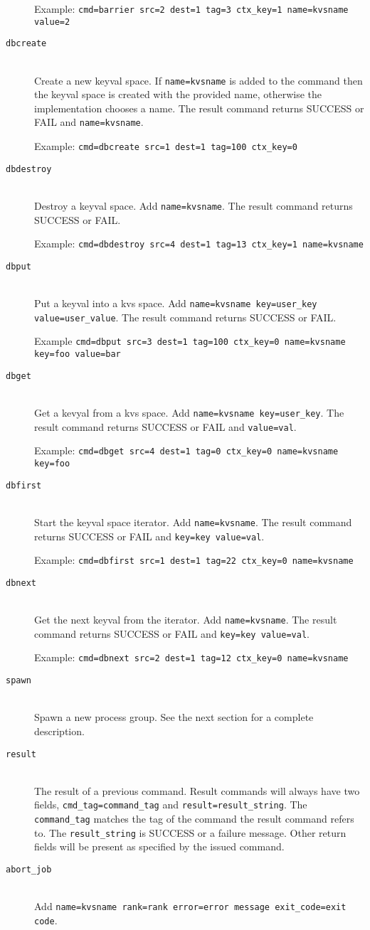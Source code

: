 \documentclass[dvipdfm,11pt]{article}
\begin{document}
\begin{description}
Example: \texttt{cmd=barrier src=2 dest=1 tag=3 ctx\_key=1 name=kvsname value=2}
\item[\texttt{dbcreate}]\mbox{}\\
Create a new keyval space.  If \texttt{name=kvsname} is added to the command
then the keyval space is created with the provided name, otherwise the 
implementation chooses a name.
The result command returns SUCCESS or FAIL and \texttt{name=kvsname}.

Example: \texttt{cmd=dbcreate src=1 dest=1 tag=100 ctx\_key=0}
\item[\texttt{dbdestroy}]\mbox{}\\
Destroy a keyval space.  Add \texttt{name=kvsname}.
The result command returns SUCCESS or FAIL.

Example: \texttt{cmd=dbdestroy src=4 dest=1 tag=13 ctx\_key=1 name=kvsname}
\item[\texttt{dbput}]\mbox{}\\
Put a keyval into a kvs space.  Add \texttt{name=kvsname key=user\_key 
value=user\_value}.
The result command returns SUCCESS or FAIL.

Example \texttt{cmd=dbput src=3 dest=1 tag=100 ctx\_key=0 name=kvsname key=foo value=bar}
\item[\texttt{dbget}]\mbox{}\\
Get a kevyal from a kvs space.  Add \texttt{name=kvsname key=user\_key}.
The result command returns SUCCESS or FAIL and \texttt{value=val}.

Example: \texttt{cmd=dbget src=4 dest=1 tag=0 ctx\_key=0 name=kvsname key=foo}
\item[\texttt{dbfirst}]\mbox{}\\
Start the keyval space iterator.  Add \texttt{name=kvsname}.
The result command returns SUCCESS or FAIL and \texttt{key=key value=val}.

Example: \texttt{cmd=dbfirst src=1 dest=1 tag=22 ctx\_key=0 name=kvsname}
\item[\texttt{dbnext}]\mbox{}\\
Get the next keyval from the iterator.  Add \texttt{name=kvsname}.
The result command returns SUCCESS or FAIL and \texttt{key=key value=val}.

Example: \texttt{cmd=dbnext src=2 dest=1 tag=12 ctx\_key=0 name=kvsname}
\item[\texttt{spawn}]\mbox{}\\
Spawn a new process group.  See the next section for a complete description.
\item[\texttt{result}]\mbox{}\\
The result of a previous command.  Result commands will always have two 
fields, \texttt{cmd\_tag=command\_tag} and \texttt{result=result\_string}.
The \texttt{command\_tag} matches the tag of the command the result command 
refers to.  The \texttt{result\_string} is SUCCESS or a failure message. 
Other return fields will be present as specified by the issued command.
\item[\texttt{abort\_job}]\mbox{}\\
Add \texttt{name=kvsname
rank=rank
error=error message
exit\_code=exit code}.


\end{description}
\end{document}
